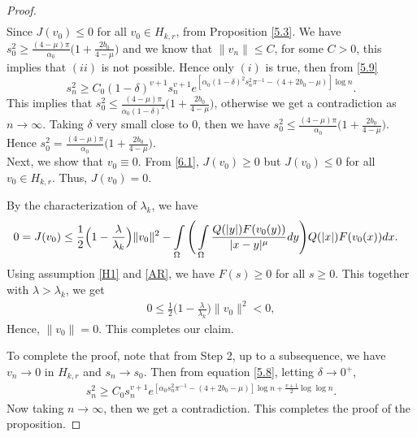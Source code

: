 \documentclass[11pt]{amsart}
\numberwithin{equation}{section}
\newcommand{\1}{\frac{1}{2}}
\begin{document}
\begin{proof}
\begin{align}
		\end{align}
		Since $J(v_0) \leq 0$ for all $v_0 \in H_{k,r}$, from Proposition \ref{5.3}. We have  $s_0^2 \geq \frac{(4-\mu)\pi}{\alpha_0} \Big( 1+\frac{2b_0}{4-\mu}\Big)$ and we know that $\|v_n\|\leq C$, for some $C>0$, this implies that $(ii)$ is not possible. Hence only $(i)$ is true, then from \eqref{5.9}
		\[ s_n^2 \geq C_0(1-\delta)^{v+1} s_n^{v+1} e^{[\alpha_0 (1-\delta)^2 s_n^2 \pi^{-1}-(4+2b_0-\mu)]\log{n}}.\]
		This implies that $s_0^2 \leq \frac{(4-\mu)\pi}{\alpha_0 (1-\delta)^2} \Big(1+\frac{2b_0}{4-\mu}\Big)$, otherwise we get a contradiction as $n\to \infty$. Taking $\delta$ very small close to 0, then we have $s_0^2 \leq \frac{(4-\mu)\pi}{\alpha_0}\Big(1+\frac{2b_0}{4-\mu}\Big)$. Hence $s_0^2 = \frac{(4-\mu)\pi}{\alpha_0}\Big(1+\frac{2b_0}{4-\mu}\Big)$.\\
		Next, we show that $v_0 \equiv 0$. From \eqref{6.1}, $J(v_0) \geq 0$ but $J(v_0) \leq 0$ for all $v_0 \in H_{k,r}$. Thus, $J(v_0)=0$. 
		
		By the characterization of $\lambda_k$, we have
		\begin{align*}
			0= J(v_0) & \leq \frac{1}{2} \Big(1 - \frac{\lambda}{\lambda_k}\Big)\|v_0\|^2 - \int\limits\limits_\Omega \Bigg( \int\limits\limits_\Omega \frac{Q(|y|)F(v_0(y))}{|x-y|^\mu}dy\Bigg) Q(|x|)F(v_0(x))dx.
		\end{align*}
		Using assumption \eqref{H1} and \eqref{AR}, we have $F(s)\geq 0$ for all $s\geq 0$. This together with $\lambda > \lambda_k$, we get
		\begin{align*}
			0 \leq \frac{1}{2} \Big(1 - \frac{\lambda}{\lambda_k}\Big)\|v_0\|^2 <0,
		\end{align*}
		Hence, $\|v_0\|=0$. This completes our claim.
		
		To complete the proof, note that from Step 2, up to a subsequence, we have $v_n \rightarrow 0$ in $H_{k,r}$ and $s_n \rightarrow s_0$. Then from equation \eqref{5.8}, letting $\delta \rightarrow 0^+$,
		\begin{align*}
			s_n^2 \geq C_0 s_n^{v+1}e^{[ \alpha_0 s_n^2 \pi^{-1} - (4+2b_0-\mu)]\log{n} + \frac{v+1}{2}\log{\log{n}}}.
		\end{align*}
		Now taking $n\rightarrow \infty$, then we get a contradiction. This completes the proof of the proposition.
	\end{proof}
\end{document}
